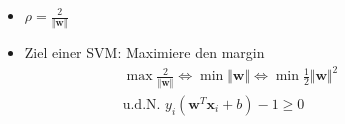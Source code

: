 \begin{frame}
\begin{figure}[h]
        \begin{itemize}
            \item $ \rho = \frac{2}{\Vert \boldsymbol{w} \Vert} $
            \item Ziel einer SVM: Maximiere den margin
                \begin{align*}
                    & \max \frac{2}{\Vert \boldsymbol{w} \Vert} \Leftrightarrow \min \Vert \boldsymbol{w} \Vert \Leftrightarrow \min \frac{1}{2} \Vert \boldsymbol{w} \Vert^2 \\
                    & \text{u.d.N. } y_i ( \boldsymbol{w}^T \boldsymbol{x}_i + b ) - 1 \geq 0 \\
                \end{align*}
        \end{itemize}
    \end{figure}
\end{frame}

